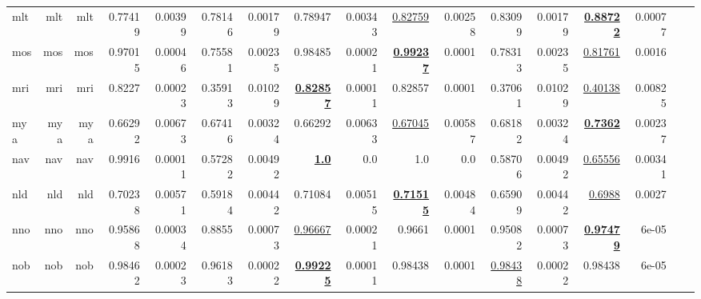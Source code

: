 \documentclass[11pt]{article}
\begin{document}
\begin{table*}[h]
{\begin{tabular}{lrrrrrrrrrrrrrrrr}
mlt         & mlt         & mlt         & 0.77419         & 0.00399         & 0.78146         & 0.00179         & 0.78947         & 0.00343         & \underline{0.82759}         & 0.00258         & 0.83099         & 0.00179         & \textbf{\underline{0.88722}}         & 0.00077         \\
mos         & mos         & mos         & 0.97015         & 0.00046         & 0.75581         & 0.00235         & 0.98485         & 0.00021         & \textbf{\underline{0.99237}}         & 0.0001         & 0.78313         & 0.00235         & \underline{0.81761}         & 0.0016         \\
mri         & mri         & mri         & 0.8227         & 0.00023         & 0.35913         & 0.01029         & \textbf{\underline{0.82857}}         & 0.00011         & 0.82857         & 0.0001         & 0.37061         & 0.01029         & \underline{0.40138}         & 0.00825         \\
mya         & mya         & mya         & 0.66292         & 0.00673         & 0.67416         & 0.00324         & 0.66292         & 0.00633         & \underline{0.67045}         & 0.00587         & 0.68182         & 0.00324         & \textbf{\underline{0.7362}}         & 0.00237         \\
nav         & nav         & nav         & 0.9916         & 0.00011         & 0.57282         & 0.00492         & \textbf{\underline{1.0}}         & 0.0         & 1.0         & 0.0         & 0.58706         & 0.00492         & \underline{0.65556}         & 0.00341         \\
nld         & nld         & nld         & 0.70238         & 0.00571         & 0.59184         & 0.00442         & 0.71084         & 0.00515         & \textbf{\underline{0.71515}}         & 0.00484         & 0.65909         & 0.00442         & \underline{0.6988}         & 0.0027         \\
nno         & nno         & nno         & 0.95868         & 0.00034         & 0.8855         & 0.00073         & \underline{0.96667}         & 0.00021         & 0.9661         & 0.0001         & 0.95082         & 0.00073         & \textbf{\underline{0.97479}}         & 6e-05         \\
nob         & nob         & nob         & 0.98462         & 0.00023         & 0.96183         & 0.00022         & \textbf{\underline{0.99225}}         & 0.00011         & 0.98438         & 0.0001         & \underline{0.98438}         & 0.00022         & 0.98438         & 6e-05         \\

\end{tabular}}
\end{table*}
\end{document}
